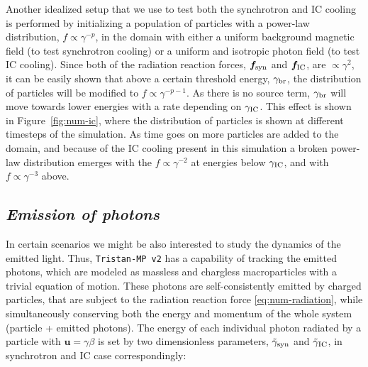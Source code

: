 Another idealized setup that we use to test both the synchrotron and IC cooling is performed by initializing a population of particles with a power-law distribution, $f\propto \gamma^{-p}$, in the domain with either a uniform background magnetic field (to test synchrotron cooling) or a uniform and isotropic photon field (to test IC cooling). Since both of the radiation reaction forces, $\bm{f}_{\rm syn}$ and $\bm{f}_{\rm IC}$, are $\propto \gamma^2$, it can be easily shown \citep[see, e.g.,][]{1979rpa..book.....R} that above a certain threshold energy, $\gamma_{\rm br}$, the distribution of particles will be modified to $f\propto \gamma^{-p-1}$. As there is no source term, $\gamma_{\rm br}$ will move towards lower energies with a rate depending on $\gamma_{\rm IC}$. This effect is shown in Figure~\ref{fig:num-ic}, where the distribution of particles is shown at different timesteps of the simulation. As time goes on more particles are added to the domain, and because of the IC cooling present in this simulation a broken power-law distribution emerges with the $f\propto \gamma^{-2}$ at energies below $\gamma_{\rm IC}$, and with $f\propto \gamma^{-3}$ above.


\subsection*{\small \it Emission of photons}

In certain scenarios we might be also interested to study the dynamics of the emitted light. Thus, \texttt{Tristan-MP v2} has a capability of tracking the emitted photons, which are modeled as massless and chargless macroparticles with a trivial equation of motion. These photons are self-consistently emitted by charged particles, that are subject to the radiation reaction force \eqref{eq:num-radiation}, while simultaneously conserving both the energy and momentum of the whole system (particle + emitted photons). The energy of each individual photon radiated by a particle with $\bm{u}=\gamma\beta$ is set by two dimensionless parameters, $\tilde{\gamma}_{\rm syn}$ and $\tilde{\gamma}_{\rm IC}$, in synchrotron and IC case correspondingly:

